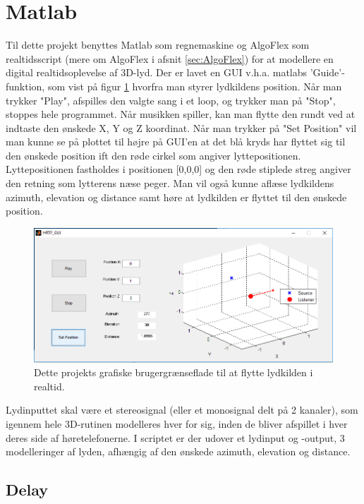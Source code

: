 \section{Matlab}

Til dette projekt benyttes Matlab som regnemaskine og AlgoFlex som realtidsscript (mere om AlgoFlex i afsnit \ref{sec:AlgoFlex}) for at modellere en digital realtidsoplevelse af 3D-lyd. Der er lavet en GUI v.h.a. matlabs 'Guide'-funktion, som vist på figur \ref{fig:gui} hvorfra man styrer lydkildens position. Når man trykker "Play", afspilles den valgte sang i et loop, og trykker man på "Stop", stoppes hele programmet. Når musikken spiller, kan man flytte den rundt ved at indtaste den ønskede X, Y og Z koordinat. Når man trykker på "Set Position" vil man kunne se på plottet til højre på GUI'en at det blå kryds har flyttet sig til den ønskede position ift den røde cirkel som angiver lyttepositionen. Lyttepositionen fastholdes i positionen [0,0,0] og den røde stiplede streg angiver den retning som lytterens næse peger. Man vil også kunne aflæse lydkildens azimuth, elevation og distance samt høre at lydkilden er flyttet til den ønskede position. 

\begin{figure}
	\centering
	\includegraphics[width=1\linewidth]{All_Pics/GUI}
	\caption{Dette projekts grafiske brugergrænseflade til at flytte lydkilden i realtid.}
	\label{fig:gui}
\end{figure}


Lydinputtet skal være et stereosignal (eller et monosignal delt på 2 kanaler), som igennem hele 3D-rutinen modelleres hver for sig, inden de bliver afspillet i hver deres side af høretelefonerne. I scriptet er der udover et lydinput og -output, 3 modelleringer af lyden, afhængig af den ønskede azimuth, elevation og distance. 

\subsection{Delay}

